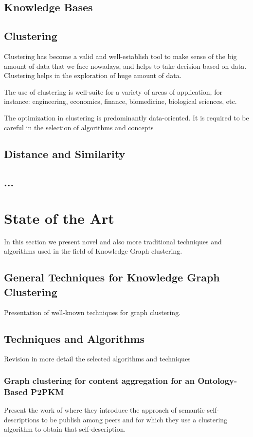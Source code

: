 \documentclass[runningheads]{llncs}
\begin{document}
\subsection{Knowledge Bases}
\subsection{Clustering}
Clustering has become a valid and well-establish tool to make sense of the big amount of data that we face nowadays, and helps to take decision based on data. Clustering helps in the exploration of huge amount of data. \cite{Pedrycz}

The use of clustering is well-suite for a variety of areas of application, for instance: engineering, economics, finance, biomedicine, biological sciences, etc. \cite{Pedrycz}

The optimization in clustering is predominantly data-oriented. \cite{Pedrycz}
It is required to be careful in the selection of algorithms and concepts 

\subsection{Distance and Similarity}

\subsection{...}

\section{State of the Art}
In this section we present novel and also more traditional techniques and algorithms used in the field of Knowledge Graph clustering. 

\subsection{General Techniques for Knowledge Graph Clustering}
Presentation of well-known techniques for graph clustering.

\subsection{Techniques and Algorithms}
Revision in more detail the selected algorithms and techniques 
\subsubsection{Graph clustering for content aggregation for an Ontology-Based P2PKM}
Present the work of \cite{Schmitz} where they introduce the approach of semantic self-descriptions to be publish among peers and for which they use a clustering algorithm to obtain that self-description.
\end{document}
